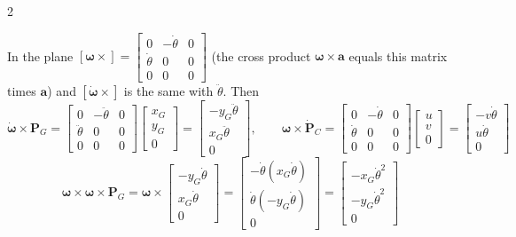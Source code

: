 \begin{multicols}{2}
\begin{fbx}
\end{fbx}
\begin{deriv}
In the plane $[\boldsymbol\omega\times]=\begin{bmatrix}0&-\dot\theta&0\\\dot\theta&0&0\\0&0&0\end{bmatrix}$ (the cross product $\boldsymbol\omega\times\mathbf a$ equals this matrix times $\mathbf a$) and $[\dot{\boldsymbol\omega}\times]$ is the same with $\ddot\theta$. Then
\[\dot{\boldsymbol\omega}\times\mathbf P_G=\begin{bmatrix}0&-\ddot\theta&0\\\ddot\theta&0&0\\0&0&0\end{bmatrix}\begin{bmatrix}x_G\\y_G\\0\end{bmatrix}=\begin{bmatrix}-y_G\ddot\theta\\x_G\ddot\theta\\0\end{bmatrix},\qquad
\boldsymbol\omega\times\dot{\mathbf P}_C=\begin{bmatrix}0&-\dot\theta&0\\\dot\theta&0&0\\0&0&0\end{bmatrix}\begin{bmatrix}u\\v\\0\end{bmatrix}=\begin{bmatrix}-v\dot\theta\\u\dot\theta\\0\end{bmatrix}\]
\[\boldsymbol\omega\times\boldsymbol\omega\times\mathbf P_G=\boldsymbol\omega\times\begin{bmatrix}-y_G\dot\theta\\x_G\dot\theta\\0\end{bmatrix}=\begin{bmatrix}-\dot\theta(x_G\dot\theta)\\\dot\theta(-y_G\dot\theta)\\0\end{bmatrix}=\begin{bmatrix}-x_G\dot\theta^2\\-y_G\dot\theta^2\\0\end{bmatrix}\]

\end{deriv}
\end{multicols}
